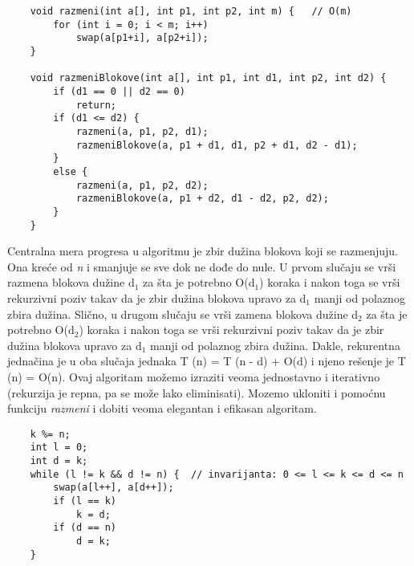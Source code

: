 \documentclass{article}
\begin{document}
\begin{lstlisting}
    void razmeni(int a[], int p1, int p2, int m) {   // O(m)
        for (int i = 0; i < m; i++)
            swap(a[p1+i], a[p2+i]);
    }
    
    void razmeniBlokove(int a[], int p1, int d1, int p2, int d2) {
        if (d1 == 0 || d2 == 0)
            return;
        if (d1 <= d2) {
            razmeni(a, p1, p2, d1);
            razmeniBlokove(a, p1 + d1, d1, p2 + d1, d2 - d1);
        } 
        else {
            razmeni(a, p1, p2, d2);
            razmeniBlokove(a, p1 + d2, d1 - d2, p2, d2);
        }
    }
\end{lstlisting}
Centralna mera progresa u algoritmu je zbir dužina blokova koji se razmenjuju.
Ona kreće od \textit{n} i smanjuje se sve dok ne dođe do nule. U prvom slučaju se vrši
razmena blokova dužine d$_1$ za šta je potrebno O(d$_1$) koraka i nakon toga se vrši
rekurzivni poziv takav da je zbir dužina blokova upravo za d$_1$ manji od polaznog
zbira dužina. Slično, u drugom
slučaju se vrši zamena blokova dužine d$_2$ za šta je potrebno O(d$_2$) koraka i nakon
toga se vrši rekurzivni poziv takav da je zbir dužina blokova upravo za d$_1$ manji
od polaznog zbira dužina. Dakle, rekurentna jednačina je u oba slučaja jednaka T (n) = T (n - d) + O(d) i njeno rešenje je T (n) = O(n).
\newline Ovaj algoritam možemo izraziti veoma jednostavno i iterativno (rekurzija je
repna, pa se može lako eliminisati). Mozemo ukloniti i pomoćnu funkciju \textit{razmeni} i dobiti veoma elegantan
i efikasan algoritam.
\begin{lstlisting}
    k %= n;
    int l = 0; 
    int d = k; 
    while (l != k && d != n) {  // invarijanta: 0 <= l <= k <= d <= n
        swap(a[l++], a[d++]);
        if (l == k) 
            k = d;
        if (d == n)
            d = k;
    }
\end{lstlisting}
\end{document}
